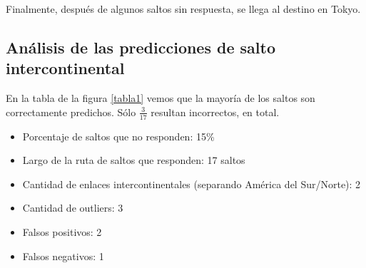 Finalmente, después de algunos saltos sin respuesta, se llega al destino en Tokyo.

\subsection{Análisis de las predicciones de salto intercontinental}

En la tabla de la figura \ref{tabla1} vemos que la mayoría de los saltos son correctamente predichos. Sólo $\frac{3}{17}$ resultan incorrectos, en total.

\begin{itemize}
	\item Porcentaje de saltos que no responden: 15\%
	\item Largo de la ruta de saltos que responden: 17 saltos 
	\item Cantidad de enlaces intercontinentales (separando América del Sur/Norte): 2
	\item Cantidad de outliers: 3
	\item Falsos positivos: 2
	\item Falsos negativos: 1
\end{itemize}

